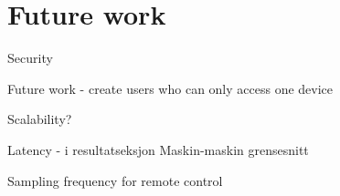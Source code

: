 \chapter{Future work}

Security


Future work - create users who can only access one device 

Scalability? 

Latency - i resultatseksjon
Maskin-maskin grensesnitt

Sampling frequency for remote control